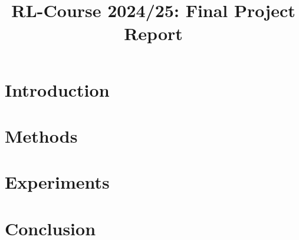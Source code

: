 \documentclass[11pt]{article}
\title{RL-Course 2024/25: Final Project Report}
\author{\theteam}
\begin{document}
\maketitle

\section{Introduction}


\section{Methods}




\section{Experiments}




\section{Conclusion}




\end{document}
